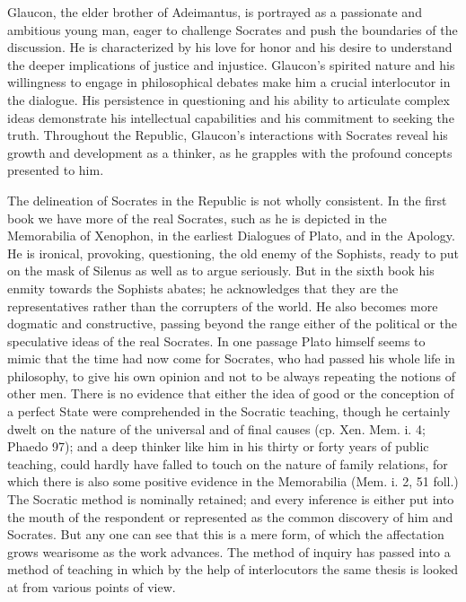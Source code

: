 Glaucon, the elder brother of Adeimantus, is portrayed as a passionate and ambitious young man, eager to challenge Socrates and push the boundaries of the discussion. He is characterized by his love for honor and his desire to understand the deeper implications of justice and injustice. Glaucon's spirited nature and his willingness to engage in philosophical debates make him a crucial interlocutor in the dialogue. His persistence in questioning and his ability to articulate complex ideas demonstrate his intellectual capabilities and his commitment to seeking the truth. Throughout the Republic, Glaucon's interactions with Socrates reveal his growth and development as a thinker, as he grapples with the profound concepts presented to him.

The delineation of Socrates in the Republic is not wholly consistent. In the first book we have more of the real Socrates, such as he is depicted in the Memorabilia of Xenophon, in the earliest Dialogues of Plato, and in the Apology. He is ironical, provoking, questioning, the old enemy of the Sophists, ready to put on the mask of Silenus as well as to argue seriously. But in the sixth book his enmity towards the Sophists abates; he acknowledges that they are the representatives rather than the corrupters of the world. He also becomes more dogmatic and constructive, passing beyond the range either of the political or the speculative ideas of the real Socrates. In one passage Plato himself seems to mimic that the time had now come for Socrates, who had passed his whole life in philosophy, to give his own opinion and not to be always repeating the notions of other men. There is no evidence that either the idea of good or the conception of a perfect State were comprehended in the Socratic teaching, though he certainly dwelt on the nature of the universal and of final causes (cp. Xen. Mem. i. 4; Phaedo 97); and a deep thinker like him in his thirty or forty years of public teaching, could hardly have falled to touch on the nature of family relations, for which there is also some positive evidence in the Memorabilia (Mem. i. 2, 51 foll.) The Socratic method is nominally retained; and every inference is either put into the mouth of the respondent or represented as the common discovery of him and Socrates. But any one can see that this is a mere form, of which the affectation grows wearisome as the work advances. The method of inquiry has passed into a method of teaching in which by the help of interlocutors the same thesis is looked at from various points of view.

